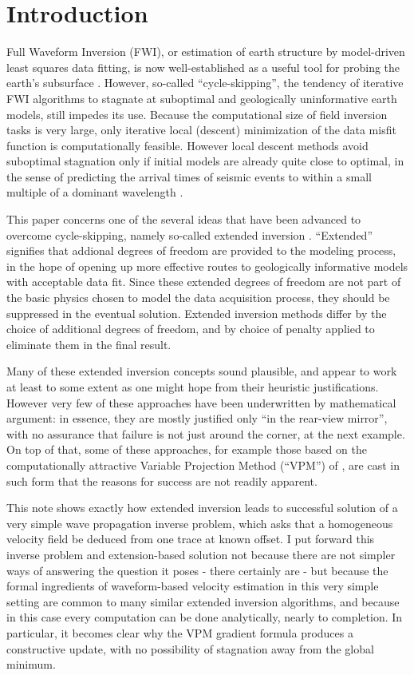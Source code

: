 \section{Introduction}
Full Waveform Inversion (FWI), or estimation of earth structure by
model-driven least squares data fitting, is now well-established as a
useful tool for probing the earth's subsurface
\cite[]{VirieuxOperto:09,Fichtner:10}. However, so-called ``cycle-skipping'', the tendency of iterative FWI
algorithms to stagnate at suboptimal and geologically uninformative
earth models, still impedes its use. Because the computational size of field inversion tasks
is very large, only iterative local (descent) minimization of the data
misfit function is computationally feasible. However local
descent methods avoid suboptimal stagnation only if initial models are
already quite close to optimal, in the sense of predicting the arrival
times of seismic events to within a small multiple of a dominant
wavelength \cite[]{GauTarVir:86,Plessix:10}.

This paper concerns one of the several ideas that have been advanced to
overcome cycle-skipping, namely so-called extended inversion
\cite[]{geoprosp:2008}. ``Extended'' signifies that addional degrees
of freedom are provided to the modeling process, in the hope of
opening up more effective routes to geologically informative models
with acceptable data fit. Since these extended degrees of freedom are
not part of the basic physics chosen to model the data acquisition
process, they should be suppressed in the eventual solution. Extended
inversion methods differ by the choice of additional degrees of
freedom, and by choice of penalty applied to eliminate them in the final
result.

Many of these extended inversion concepts sound plausible, and appear
to work at least to some extent as one might hope from their heuristic
justifications. However very few of these approaches have been
underwritten by mathematical argument: in essence, they are mostly
justified only ``in the rear-view mirror'', with no assurance that
failure is not just around the corner, at the next example. On top of
that, some of these approaches, for example those based on the
computationally attractive Variable Projection Method (``VPM'') of
\cite{GolubPereyra:03}, are cast in such form that the reasons for
success are not readily apparent.

This note shows exactly how extended inversion leads to successful solution
of a very simple wave propagation inverse
problem, which asks that a homogeneous velocity field be deduced from
one trace at known offset. I put forward this inverse problem and
extension-based solution not because there are not simpler
ways of answering the question it poses - there certainly are - but
because the formal ingredients of waveform-based velocity estimation
in this very simple setting are common to many similar extended
inversion algorithms, and because in this case every computation can
be done analytically, nearly to completion. In particular, it becomes
clear why the VPM gradient formula produces a constructive update,
with no possibility of stagnation away from the global minimum.

